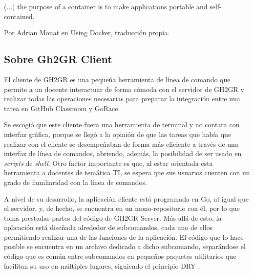 \begin{displayquote}
(...) the purpose of a container is to make applications portable and self-contained.
\end{displayquote}
Por  Adrian Mouat en Using Docker\cite{Mouat2015-uh}, traducción propia.


\subsection{Sobre Gh2GR Client}
El cliente de GH2GR es una pequeña herramienta de línea de comando que permite a un docente interactuar de forma cómoda con el servidor de GH2GR y realizar todas las operaciones necesarias para preparar la integración entre una tarea en GitHub Classroom y GoRace.

Se escogió que este cliente fuera una herramienta de terminal y no contara con interfaz gráfica, porque se llegó a la opinión de que las tareas que había que realizar con el cliente se desempeñaban de forma más eficiente a través de una interfaz de línea de comandos, abriendo, además, la posibilidad de ser usado en \textit{scripts} de \textit{shell}. Otro factor importante es que, al estar orientada esta herramienta a docentes de temática \acrshort{TI}, se espera que sus usuarios cuenten con un grado de familiaridad con la línea de comandos.

A nivel de su desarrollo, la aplicación cliente está programada en Go, al igual que el servidor, y, de hecho, se encuentra en un mono-repositorio con él, por lo que toma prestadas partes del código de GH2GR Server. Más allá de esto, la aplicación está diseñada alrededor de subcomandos, cada uno de ellos permitiendo realizar una de las funciones de la aplicación. El código que lo hace posible se encuentra en un archivo dedicado a dicho subcomando, separándose el código que es común entre subcomandos en pequeños paquetes utilitarios que facilitan su uso en múltiples lugares, siguiendo el principio \acrshort{DRY} \cite{Hunt1999-sb}.

